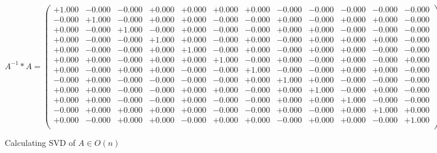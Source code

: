\documentclass[9pt]{article}
\theoremstyle{plain}
\theoremstyle{definition}
\theoremstyle{remark}
\numberwithin{equation}{section}
\begin{document}
$A^{-1} *A = \left(
\begin{array}{
cccccccccccc}
+1.000 & -0.000 & -0.000 & +0.000 & +0.000 & +0.000 & +0.000 & -0.000 & -0.000 & -0.000 & -0.000 & -0.000 \\
-0.000 & +1.000 & -0.000 & +0.000 & +0.000 & -0.000 & -0.000 & +0.000 & -0.000 & +0.000 & +0.000 & -0.000 \\
+0.000 & -0.000 & +1.000 & -0.000 & +0.000 & -0.000 & -0.000 & +0.000 & +0.000 & -0.000 & -0.000 & -0.000 \\
+0.000 & -0.000 & -0.000 & +1.000 & +0.000 & -0.000 & +0.000 & -0.000 & +0.000 & +0.000 & +0.000 & -0.000 \\
+0.000 & -0.000 & -0.000 & +0.000 & +1.000 & -0.000 & +0.000 & -0.000 & +0.000 & +0.000 & -0.000 & -0.000 \\
+0.000 & +0.000 & -0.000 & +0.000 & +0.000 & +1.000 & -0.000 & +0.000 & -0.000 & +0.000 & -0.000 & +0.000 \\
+0.000 & -0.000 & +0.000 & +0.000 & -0.000 & -0.000 & +1.000 & -0.000 & -0.000 & +0.000 & +0.000 & -0.000 \\
-0.000 & +0.000 & -0.000 & -0.000 & -0.000 & -0.000 & +0.000 & +1.000 & +0.000 & -0.000 & -0.000 & -0.000 \\
+0.000 & +0.000 & -0.000 & -0.000 & +0.000 & +0.000 & -0.000 & +0.000 & +1.000 & -0.000 & +0.000 & -0.000 \\
+0.000 & +0.000 & -0.000 & -0.000 & +0.000 & -0.000 & -0.000 & +0.000 & +0.000 & +1.000 & -0.000 & -0.000 \\
-0.000 & +0.000 & +0.000 & +0.000 & +0.000 & -0.000 & -0.000 & +0.000 & -0.000 & +0.000 & +1.000 & +0.000 \\
+0.000 & -0.000 & +0.000 & +0.000 & -0.000 & +0.000 & +0.000 & -0.000 & +0.000 & +0.000 & -0.000 & +1.000 \\
\end{array}
\right)$ \newline 

Calculating SVD of  $A \in O(n)$
\end{document}
